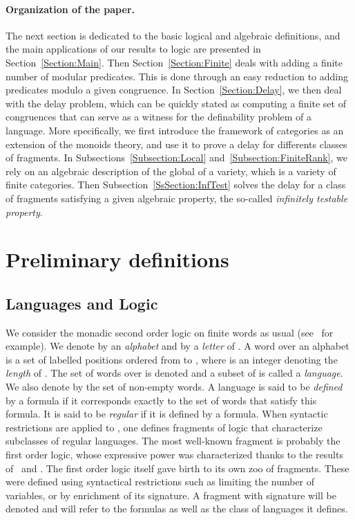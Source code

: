 \documentclass[submission,hidelink]{dmtcs-episciences}
\begin{document}
	\paragraph{Organization of the paper.}
	The next section is dedicated to the basic logical and algebraic definitions, and the main applications of our results to logic are presented in Section~\ref{Section:Main}.
	 Then Section~\ref{Section:Finite} deals with adding a finite number of modular predicates.
	 This is done through an easy reduction to adding predicates modulo a given congruence.
	 In Section~\ref{Section:Delay}, we then deal with the delay problem, which can be quickly stated as computing a finite set of congruences that can serve as a witness for the definability problem of a language.
	 More specifically, we first introduce the framework of categories as an extension of the monoids theory,
	 and use it to prove a delay for differents classes of fragments.
	 In Subsections~\ref{Subsection:Local} and~\ref{Subsection:FiniteRank}, we rely on an algebraic description of the global of a variety, which is a variety of finite categories.
	 Then Subsection~\ref{SsSection:InfTest} solves the delay for a class of fragments satisfying a given algebraic property, the so-called \emph{infinitely testable property}.

\section{Preliminary definitions}\label{Section:Defs}
	\subsection{Languages and Logic}
	We consider the monadic second order logic on finite words  as usual
	(see~\cite{Straubing94} for example).
	We denote by  an \emph{alphabet} and by  a \emph{letter} of .
	A word  over an alphabet  is a set of labelled positions ordered from  to , where  is an integer denoting the \emph{length} of .
	The set of words over  is denoted  and a subset  of  is called a \emph{language}.
	We also denote by  the set of non-empty words.
	A language is said to be \emph{defined} by a formula if it corresponds exactly
	to the set of words that satisfy this formula.
	It is said to be \emph{regular} if it is defined by a  formula.
	When syntactic restrictions are applied to ,
	one defines fragments of logic that characterize subclasses of regular languages.
	The most well-known fragment is probably the first order logic,
	whose expressive power was characterized
	thanks to the results of~\cite{MP71} and \cite{Schutzenberger65}.
	The first order logic itself gave birth to its own zoo of fragments.
	These were defined using syntactical restrictions such as limiting the number of variables,
	or by enrichment of its signature.
	A fragment  with signature  will  be denoted  and will refer to the formulas as well as the class of languages it
	defines.
\end{document}
